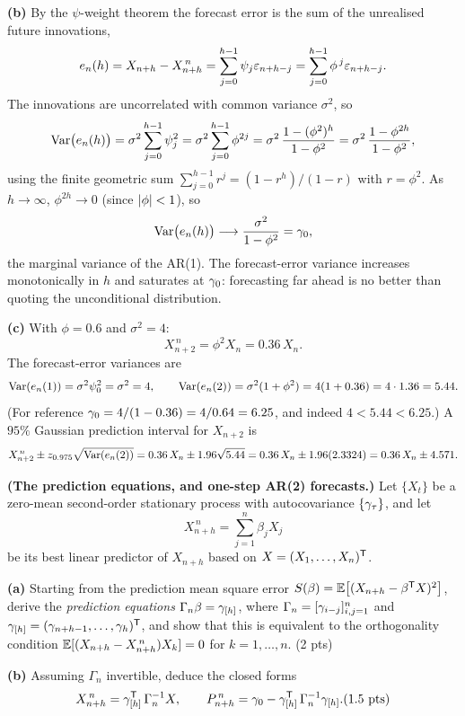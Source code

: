 \documentclass[11pt]{article}
\begin{document}
\textbf{(b)} By the $\psi$-weight theorem the forecast error is the sum of the unrealised future innovations,
\[
e_n(h)=X_{n+h}-X^{\,n}_{n+h}=\sum_{j=0}^{h-1}\psi_j\varepsilon_{n+h-j}
=\sum_{j=0}^{h-1}\phi^{\,j}\varepsilon_{n+h-j}.
\]
The innovations are uncorrelated with common variance $\sigma^2$, so
\[
\operatorname{Var}\bigl(e_n(h)\bigr)=\sigma^2\sum_{j=0}^{h-1}\psi_j^2
=\sigma^2\sum_{j=0}^{h-1}\phi^{2j}
=\sigma^2\,\frac{1-(\phi^2)^h}{1-\phi^2}
=\sigma^2\,\frac{1-\phi^{2h}}{1-\phi^2},
\]
using the finite geometric sum $\sum_{j=0}^{h-1}r^j=(1-r^h)/(1-r)$ with $r=\phi^2$. As $h\to\infty$, $\phi^{2h}\to0$ (since $\left\lvert \phi \right\rvert<1$), so
\[
\operatorname{Var}\bigl(e_n(h)\bigr)\longrightarrow\frac{\sigma^2}{1-\phi^2}=\gamma_0,
\]
the marginal variance of the AR(1). The forecast-error variance increases monotonically in $h$ and saturates at $\gamma_0$: forecasting far ahead is no better than quoting the unconditional distribution.

\textbf{(c)} With $\phi=0.6$ and $\sigma^2=4$:
\[
X^{\,n}_{n+2}=\phi^2 X_n=0.36\,X_n .
\]
The forecast-error variances are
\[
\operatorname{Var}(e_n(1))=\sigma^2\psi_0^2=\sigma^2=4,
\qquad
\operatorname{Var}(e_n(2))=\sigma^2(1+\phi^2)=4(1+0.36)=4\cdot1.36=5.44 .
\]
(For reference $\gamma_0=4/(1-0.36)=4/0.64=6.25$, and indeed $4<5.44<6.25$.) A $95\%$ Gaussian prediction interval for $X_{n+2}$ is
\[
X^{\,n}_{n+2}\pm z_{0.975}\sqrt{\operatorname{Var}(e_n(2))}
=0.36\,X_n\pm1.96\sqrt{5.44}
=0.36\,X_n\pm1.96(2.3324)
=0.36\,X_n\pm4.571 .
\]

\statementstart
\textbf{(The prediction equations, and one-step AR(2) forecasts.)} Let $\{X_t\}$ be a zero-mean second-order stationary process with autocovariance $\{\gamma_\tau\}$, and let
\[
X^{\,n}_{n+h}=\sum_{j=1}^{n}\beta_j X_j
\]
be its best linear predictor of $X_{n+h}$ based on $X=(X_1,\dots,X_n)^{\mathsf{T}}$.

\textbf{(a)} Starting from the prediction mean square error $S(\beta)=\mathbb{E}\bigl[(X_{n+h}-\beta^{\mathsf{T}} X)^2\bigr]$, derive the \emph{prediction equations} $\Gamma_n\beta=\gamma_{[h]}$, where $\Gamma_n=[\gamma_{i-j}]_{i,j=1}^n$ and $\gamma_{[h]}=(\gamma_{n+h-1},\dots,\gamma_h)^{\mathsf{T}}$, and show that this is equivalent to the orthogonality condition $\mathbb{E}[(X_{n+h}-X^{\,n}_{n+h})X_k]=0$ for $k=1,\dots,n$. \hfill(2 pts)

\textbf{(b)} Assuming $\Gamma_n$ invertible, deduce the closed forms
\[
X^{\,n}_{n+h}=\acvs_{[h]}\Tr\,\Gamma_n^{-1}X,
\qquad
P^{\,n}_{n+h}=\acvs_0-\acvs_{[h]}\Tr\,\Gamma_n^{-1}\acvs_{[h]} . \hfill(1.5\text{ pts})
\]
\end{document}
